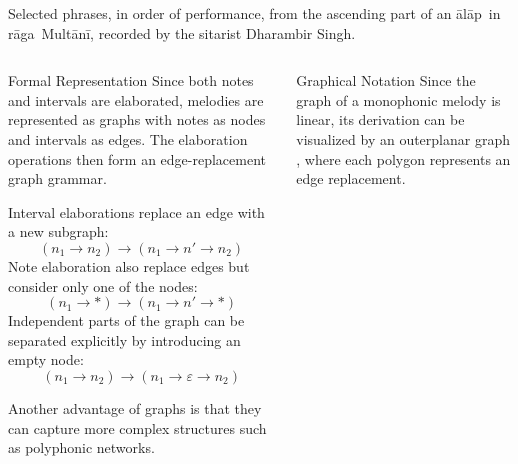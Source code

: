 \documentclass[final]{beamer}
\newcommand{\raga}{r\=aga}
\newcommand{\alap}{\=al\=ap}
\newcommand{\multani}{Mult\=an\=i}
\begin{document}
\begin{frame}[t]
  \begin{tikzpicture}[
    operation/.style={text opacity=0},
    every node/.style={circle,inner sep=5pt,font=\small},
    xscale=1.4,yscale=3
    ]
    
  \end{tikzpicture}

  \begin{small}
    Selected phrases, in order of performance,
    from the ascending part of an \alap\ in \raga\ \multani,
    recorded by the sitarist Dharambir Singh.
  \end{small}
  
  \vfill
  
  \begin{columns}[t]
    
    \begin{column}{0.25\textwidth}
      \begin{block}{Formal Representation}
        Since both notes and intervals are elaborated,
        melodies are represented as graphs with \alert{notes as nodes}
        and \alert{intervals as edges}.
        The elaboration operations then form an edge-replacement \alert{graph grammar}.
        
        Interval elaborations replace an edge with a new subgraph:
        \[ (n_1 \to n_2) \longrightarrow (n_1 \to n' \to n_2) \]
        Note elaboration also replace edges but consider only one of the nodes:
        \[ (n_1 \to *) \longrightarrow (n_1 \to n' \to *) \]
        Independent parts of the graph can be separated explicitly
        by introducing an \alert{empty node}:
        \[ (n_1 \to n_2) \longrightarrow (n_1 \to \varepsilon \to n_2) \]

        Another advantage of graphs is that they can capture more complex structures
        such as \alert{polyphonic networks}.
      \end{block}
    \end{column}

    \begin{column}{0.25\textwidth}
      \begin{block}{Graphical Notation}
        Since the graph of a monophonic melody is linear,
        its derivation can be visualized by an \alert{outerplanar graph}
        \autocite{YustGeometryMelodicHarmonic2009},
        where each polygon represents an edge replacement.


\end{block}
\end{column}
\end{columns}
\end{frame}
\end{document}
